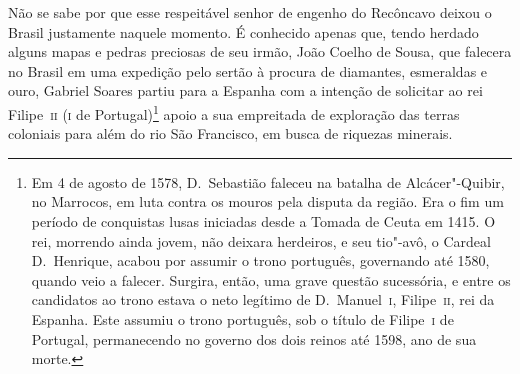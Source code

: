 Não se sabe por que esse respeitável senhor de engenho do Recôncavo
deixou o Brasil justamente naquele momento. É conhecido apenas que, tendo
herdado alguns mapas e pedras preciosas de seu irmão, João Coelho de
Sousa, que falecera no Brasil em uma expedição pelo sertão à procura de
diamantes, esmeraldas e ouro, Gabriel Soares partiu para a Espanha com
a intenção de solicitar ao rei Filipe~\textsc{ii} (\textsc{i} de Portugal)\footnote{ Em 4
de agosto de 1578, D.~Sebastião faleceu na batalha de Alcácer"-Quibir,
no Marrocos, em luta contra os mouros pela disputa da região. Era
o fim um período de conquistas lusas iniciadas desde a Tomada
de Ceuta em 1415. O rei, morrendo ainda jovem, não deixara herdeiros, e
seu tio"-avô, o Cardeal D.~Henrique, acabou por assumir o trono
português, governando até 1580, quando veio a falecer. Surgira, então,
uma grave questão sucessória, e entre os candidatos ao trono estava o
neto legítimo de D.~Manuel~\textsc{i}, Filipe~\textsc{ii}, rei da Espanha. Este assumiu o
trono português, sob o título de Filipe~\textsc{i} de Portugal, permanecendo no
governo dos dois reinos até 1598, ano de sua morte.} apoio a sua empreitada de exploração das terras coloniais para além do rio São Francisco, em busca de riquezas
minerais. 


